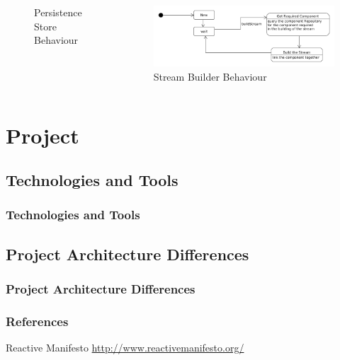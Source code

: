 \documentclass{beamer}
\begin{document}
\begin{frame}
\begin{columns}[c]
\begin{figure}
        \caption{Persistence Store Behaviour}
      \end{figure}
      \begin{figure}
        \includegraphics[width=\linewidth]{../../Docs/ProjectReport/Figures/LogicArchitecture/Server/IStreamBuiderBehavior.png}
        \caption{Stream Builder Behaviour}
      \end{figure}
    \end{columns}
\end{frame}

\section{Project}

\subsection{Technologies and Tools}

\begin{frame}
  \frametitle{Technologies and Tools}
\end{frame}

\subsection{Project Architecture Differences}

\begin{frame}
  \frametitle{Project Architecture Differences}
\end{frame}

\begin{frame}
\frametitle{References}
\footnotesize{
\begin{thebibliography}{99} %
 Reactive Manifesto
\newblock \url{http://www.reactivemanifesto.org/}
\end{thebibliography}
}
\end{frame}
\end{document}
